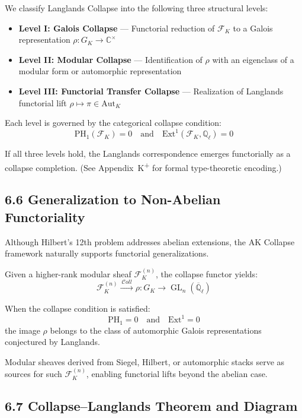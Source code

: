 \documentclass[11pt]{article}
\begin{document}
We classify Langlands Collapse into the following three structural levels:

\begin{itemize}
  \item \textbf{Level I: Galois Collapse} — Functorial reduction of \( \mathcal{F}_K \) to a Galois representation \( \rho : G_K \to \mathbb{C}^\times \)
  \item \textbf{Level II: Modular Collapse} — Identification of \( \rho \) with an eigenclass of a modular form or automorphic representation
  \item \textbf{Level III: Functorial Transfer Collapse} — Realization of Langlands functorial lift \( \rho \mapsto \pi \in \mathrm{Aut}_K \)
\end{itemize}

Each level is governed by the categorical collapse condition:
\[
\mathrm{PH}_1(\mathcal{F}_K) = 0 \quad \text{and} \quad \mathrm{Ext}^1(\mathcal{F}_K, \mathbb{Q}_\ell) = 0
\]

If all three levels hold, the Langlands correspondence emerges functorially as a collapse completion.  
(See Appendix~K\textsuperscript{+} for formal type-theoretic encoding.)

\subsection{6.6 Generalization to Non-Abelian Functoriality}

Although Hilbert's 12th problem addresses abelian extensions, the AK Collapse framework naturally supports functorial generalizations.

Given a higher-rank modular sheaf \( \mathcal{F}_K^{(n)} \), the collapse functor yields:
\[
\mathcal{F}_K^{(n)} \xrightarrow{\ \mathcal{C}oll\ } \rho : G_K \to \operatorname{GL}_n(\overline{\mathbb{Q}}_\ell)
\]

When the collapse condition is satisfied:
\[
\mathrm{PH}_1 = 0 \quad \text{and} \quad \mathrm{Ext}^1 = 0
\]
the image \( \rho \) belongs to the class of automorphic Galois representations conjectured by Langlands.  

Modular sheaves derived from Siegel, Hilbert, or automorphic stacks serve as sources for such \( \mathcal{F}_K^{(n)} \), enabling functorial lifts beyond the abelian case.

\subsection{6.7 Collapse–Langlands Theorem and Diagram}
\end{document}
